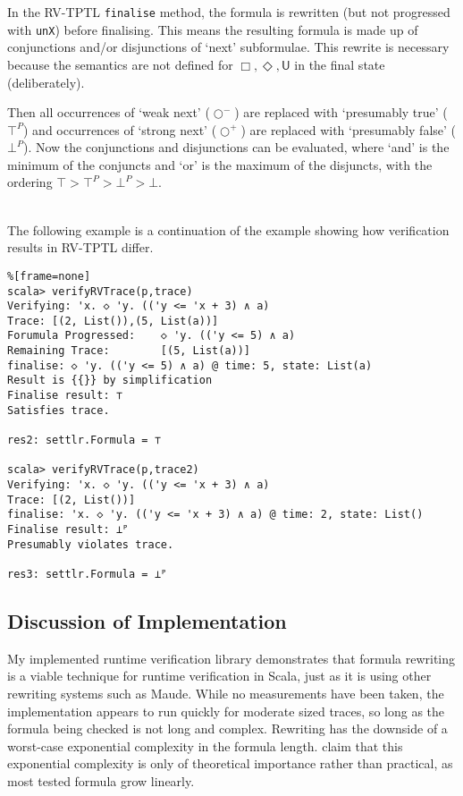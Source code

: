 \documentclass[a4paper]{article}
\newcommand{\U}{\mathsf{U}}
\newcommand{\sn}{\bigcirc^+}
\newcommand{\wn}{\bigcirc^-}
\begin{document}
In the RV-TPTL \texttt{finalise} method, the formula is rewritten (but not progressed with \texttt{unX}) before finalising. This means the resulting formula is made up of conjunctions and/or disjunctions of `next' subformulae. This rewrite is necessary because the semantics are not defined for $\Box,\Diamond,\U$ in the final state (deliberately).

Then all occurrences of `weak next' ($\wn$) are replaced with `presumably true' ($\top^P$) and occurrences of `strong next' ($\sn$) are replaced with `presumably false' ($\bot^P$). Now the conjunctions and disjunctions can be evaluated, where `and' is the minimum of the conjuncts and `or' is the maximum of the disjuncts, with the ordering $\top>\top^P>\bot^P>\bot$.

\begin{eg}~\\
  The following example is a continuation of the  example showing how verification results in RV-TPTL differ.
\begin{lstlisting}%[frame=none]
scala> verifyRVTrace(p,trace)
Verifying: 'x. ◇ 'y. (('y <= 'x + 3) ∧ a)
Trace: [(2, List()),(5, List(a))]
Forumula Progressed:    ◇ 'y. (('y <= 5) ∧ a)
Remaining Trace:        [(5, List(a))]
finalise: ◇ 'y. (('y <= 5) ∧ a) @ time: 5, state: List(a)
Result is {{}} by simplification
Finalise result: ⊤
Satisfies trace.

res2: settlr.Formula = ⊤

scala> verifyRVTrace(p,trace2)
Verifying: 'x. ◇ 'y. (('y <= 'x + 3) ∧ a)
Trace: [(2, List())]
finalise: 'x. ◇ 'y. (('y <= 'x + 3) ∧ a) @ time: 2, state: List()
Finalise result: ⊥ᴾ
Presumably violates trace.

res3: settlr.Formula = ⊥ᴾ
\end{lstlisting}
\end{eg}

\subsection{Discussion of Implementation}
My implemented runtime verification library demonstrates that formula rewriting is a viable technique for runtime verification in Scala, just as it is using other rewriting systems such as Maude. While no measurements have been taken, the implementation appears to run quickly for moderate sized traces, so long as the formula being checked is not long and complex. Rewriting has the downside of a worst-case exponential complexity in the formula length. \textcite[178]{rosu2005rewriting} claim that this exponential complexity is only of theoretical importance rather than practical, as most tested formula grow linearly.
\end{document}
